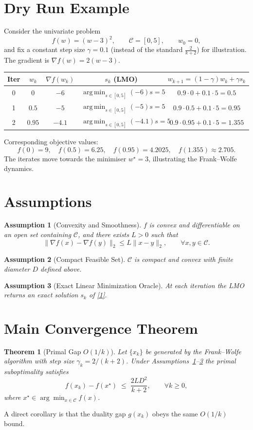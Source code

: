 \documentclass{article}
\newtheorem{theorem}{Theorem}
\newtheorem{assumption}{Assumption}
\newcommand{\argmin}{\operatorname*{arg\,min}}
\begin{document}
\section*{Dry Run Example}
Consider the univariate problem
\[
f(w) = (w-3)^2 ,\qquad \mathcal{C}=[0,5],\qquad w_0 = 0,
\]
and fix a constant step size $\gamma=0.1$ (instead of the standard $\frac{2}{k+2}$) for illustration.  
The gradient is $\nabla f(w)=2(w-3)$.

\begin{center}
\begin{tabular}{c|c|c|c|c}
\textbf{Iter} & $w_k$ & $\nabla f(w_k)$ & $s_k$ (LMO) & $w_{k+1}= (1-\gamma)w_k+\gamma s_k$\\ \hline
0 & $0$ & $-6$ & $\argmin_{s\in[0,5]}(-6)s = 5$ & $0.9\cdot0+0.1\cdot5 = 0.5$\\
1 & $0.5$ & $-5$ & $\argmin_{s\in[0,5]}(-5)s = 5$ & $0.9\cdot0.5+0.1\cdot5 = 0.95$\\
2 & $0.95$ & $-4.1$ & $\argmin_{s\in[0,5]}(-4.1)s = 5$ & $0.9\cdot0.95+0.1\cdot5 = 1.355$\\
\end{tabular}
\end{center}
Corresponding objective values:
\[
f(0)=9,\quad f(0.5)=6.25,\quad f(0.95)=4.2025,\quad f(1.355)\approx 2.705.
\]
The iterates move towards the minimiser $w^\star=3$, illustrating the Frank–Wolfe dynamics.

\newpage
\section*{Assumptions}
\begin{assumption}[Convexity and Smoothness]\label{ass:conv-smooth}
$f$ is convex and differentiable on an open set containing $\mathcal{C}$, and there exists $L>0$ such that
\[
\|\nabla f(x)-\nabla f(y)\|_2 \le L\|x-y\|_2,\qquad \forall x,y\in\mathcal{C}.
\tag{A1}
\]
\end{assumption}
\begin{assumption}[Compact Feasible Set]\label{ass:compact}
$\mathcal{C}$ is compact and convex with finite diameter $D$ defined above.
\end{assumption}
\begin{assumption}[Exact Linear Minimization Oracle]\label{ass:lmo}
At each iteration the LMO returns an exact solution $s_k$ of \eqref{1}.
\end{assumption}

\section*{Main Convergence Theorem}
\begin{theorem}[Primal Gap $O(1/k)$]\label{thm:rate}
Let $\{x_k\}$ be generated by the Frank–Wolfe algorithm with step size $\gamma_k=2/(k+2)$. Under Assumptions~\ref{ass:conv-smooth}–\ref{ass:lmo} the primal suboptimality satisfies
\[
f(x_k)-f(x^\star) \;\le\; \frac{2L D^{2}}{k+2},\qquad \forall k\ge 0,
\tag{4}
\]
where $x^\star\in\arg\min_{x\in\mathcal{C}}f(x)$.
\end{theorem}
A direct corollary is that the duality gap $g(x_k)$ obeys the same $O(1/k)$ bound.
\end{document}
